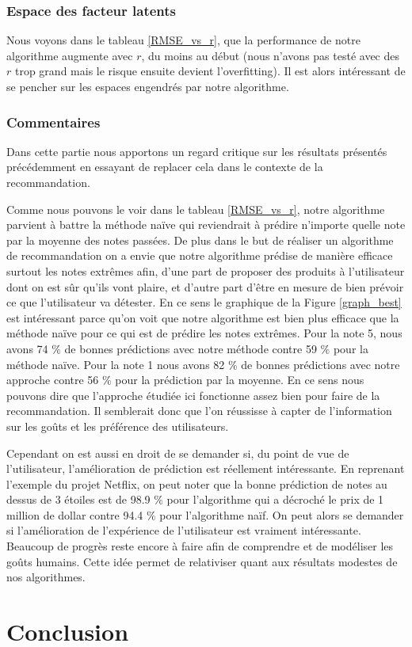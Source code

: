 \documentclass[10pt,a4paper]{article}
\begin{document}
\subsubsection*{Espace des facteur latents}

Nous voyons dans le tableau \ref{RMSE_vs_r}, que la performance de notre algorithme augmente avec $r$, du moins au début (nous n'avons pas testé avec des $r$ trop grand mais le risque ensuite devient l'overfitting). Il est alors intéressant de se pencher sur les espaces engendrés par notre algorithme. 


\subsubsection*{Commentaires}

Dans cette partie nous apportons un regard critique sur les résultats présentés précédemment en essayant de replacer cela dans le contexte de la recommandation. 

Comme nous pouvons le voir dans le tableau \ref{RMSE_vs_r}, notre algorithme parvient à battre la méthode naïve qui reviendrait à prédire n'importe quelle note par la moyenne des notes passées. De plus dans le but de réaliser un algorithme de recommandation on a envie que notre algorithme prédise de manière efficace surtout les notes extrêmes afin, d'une part de proposer des produits à l'utilisateur dont on est sûr qu'ils vont plaire, et d'autre part d'être en mesure de bien prévoir ce que l'utilisateur va détester. En ce sens le graphique de la Figure \ref{graph_best} est intéressant parce qu'on voit que notre algorithme est bien plus efficace que la méthode naïve pour ce qui est de prédire les notes extrêmes. Pour la note 5, nous avons 74 $\%$ de bonnes prédictions avec notre méthode contre 59 $\%$ pour la méthode naïve. Pour la note 1 nous avons 82 $\%$ de bonnes prédictions avec notre approche contre 56 $\%$ pour la prédiction par la moyenne. En ce sens nous pouvons dire que l'approche étudiée ici fonctionne assez bien pour faire de la recommandation. Il semblerait donc que l'on réussisse à capter de l'information sur les goûts et les préférence des utilisateurs.

Cependant on est aussi en droit de se demander si, du point de vue de l'utilisateur, l'amélioration de prédiction est réellement intéressante. En reprenant l'exemple du projet Netflix, on peut noter que la bonne prédiction de notes au dessus de 3 étoiles est de 98.9 $\%$ pour l'algorithme qui a décroché le prix de 1 million de dollar contre 94.4 $\%$ pour l'algorithme naïf. On peut alors se demander si l'amélioration de l'expérience de l'utilisateur est vraiment intéressante. Beaucoup de progrès reste encore à faire afin de comprendre et de modéliser les goûts humains. Cette idée permet de relativiser quant aux résultats modestes de nos algorithmes.

\section*{Conclusion}

\newpage



\end{document}
